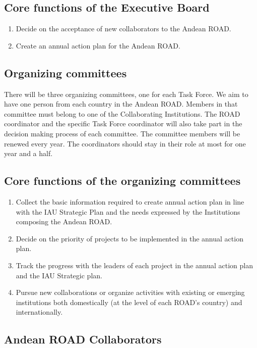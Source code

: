 \documentclass[12pt]{article}
\begin{document}
\subsection*{Core functions of the Executive Board}

\begin{enumerate}
\item Decide on the acceptance of new collaborators to the Andean ROAD.
\item Create an annual action plan for the Andean ROAD.
\end{enumerate}


\subsection*{Organizing committees}

There will be three organizing committees, one for each Task
Force. We aim to have one person from each country in the
Andean ROAD. Members in that committee must belong to one of the
Collaborating Institutions. The ROAD coordinator and the specific Task
Force coordinator will also take part in the decision making process of each
committee. The committee members will be renewed every year. The
coordinators should stay in their role at most for one year and a
half. 

\subsection*{Core functions of the organizing committees}
\begin{enumerate}
\item Collect the basic information required to create annual action
  plan in line with the IAU Strategic Plan and the needs expressed by
  the Institutions composing the Andean ROAD. 
\item Decide on the priority of projects to be implemented in the
  annual action plan. 
\item Track the progress with the leaders of each project in the
  annual action plan and the IAU Strategic plan. 
\item Pursue new collaborations or organize activities with existing
  or emerging institutions both domestically (at the level of each
  ROAD’s country) and internationally. 
 \end{enumerate}

\subsection*{Andean ROAD Collaborators}
\end{document}
